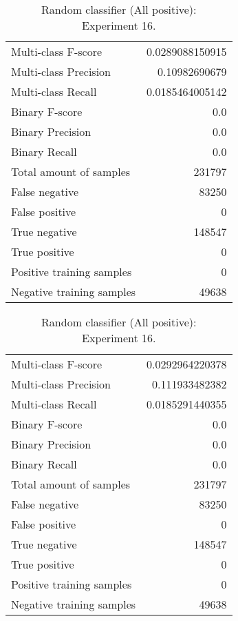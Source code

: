 \begin{table}[H]
\begin{minipage}{0.5\textwidth}
\caption{Random classifier (All positive): \\Experiment 15.}
\centering
\begin{tabular}{l r}
\toprule
Multi-class F-score & 0.0289088150915 \\
Multi-class Precision & 0.10982690679 \\
Multi-class Recall & 0.0185464005142 \\
\midrule
Binary F-score & 0.0 \\
Binary Precision & 0.0 \\
Binary Recall & 0.0 \\
\midrule
Total amount of samples & 231797 \\
False negative & 83250 \\
False positive & 0 \\
True negative & 148547 \\
True positive & 0 \\
\midrule
Positive training samples & 0 \\
Negative training samples & 49638 \\
\bottomrule
\end{tabular}
\end{minipage}
\hfillx
\begin{minipage}{0.5\textwidth}
\caption{Random classifier (All positive): \\Experiment 16.}
\centering
\begin{tabular}{l r}
\toprule
Multi-class F-score & 0.0292964220378 \\
Multi-class Precision & 0.111933482382 \\
Multi-class Recall & 0.0185291440355 \\
\midrule
Binary F-score & 0.0 \\
Binary Precision & 0.0 \\
Binary Recall & 0.0 \\
\midrule
Total amount of samples & 231797 \\
False negative & 83250 \\
False positive & 0 \\
True negative & 148547 \\
True positive & 0 \\
\midrule
Positive training samples & 0 \\
Negative training samples & 49638 \\
\bottomrule
\end{tabular}
\end{minipage}
\end{table}
